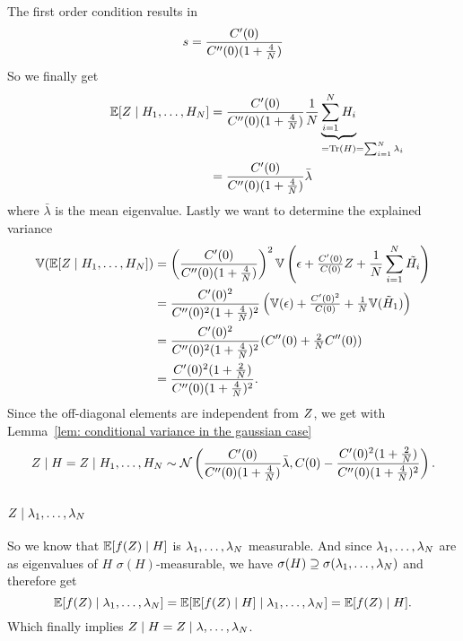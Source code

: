 The first order condition results in
\[
	s = \frac{C'(0)}{C''(0)(1+\tfrac4{N})}
\]
So we finally get
\begin{align*}
	\E[\rf\mid H_1,\dots,H_\dimension]
	&= \frac{\sqC'(0)}{\sqC''(0)(1+\tfrac4{\dimension})}
	\frac1\dimension\underbrace{\sum_{i=1}^\dimension H_i}_{
		=\trace(H) \mathrlap{=\sum_{i=1}^\dimension\lambda_i}
	}\\
	&= \frac{\sqC'(0)}{\sqC''(0)(1+\tfrac4{\dimension})}
	\bar{\lambda}
\end{align*}
where \(\bar{\lambda}\) is the mean eigenvalue. Lastly we want to determine
the explained variance
\begin{align*}
	\mathbb{V}(\mathbb{E}[Z\mid H_1,\dots,H_N])
	&= \left(\frac{C'(0)}{C''(0)(1+\tfrac4{N})}\right)^2
	\mathbb{V}\left(
		\epsilon + \tfrac{C'(0)}{C(0)}Z + \frac{1}{N}\sum_{i=1}^N \tilde{H_i}
	\right)\\
	&= \frac{C'(0)^2}{C''(0)^2(1+\tfrac4{N})^2}
	\left(
		\mathbb{V}(\epsilon) + \tfrac{C'(0)^2}{C(0)} + \tfrac1{N}\mathbb{V}(\tilde{H}_1)
	\right)\\
	&= \frac{C'(0)^2}{C''(0)^2(1+\tfrac4{N})^2}
	(C''(0) + \tfrac2{N}C''(0))\\
	&= \frac{C'(0)^2(1+\tfrac2{N})}{C''(0)(1+\tfrac4{N})^2}.
\end{align*}
Since the off-diagonal elements are independent from \(Z\), we get with
Lemma~\ref{lem: conditional variance in the gaussian case}
\[
	Z\mid H = Z \mid H_1,\dots, H_N \sim \mathcal{N}\left(
		\frac{C'(0)}{C''(0)(1+\tfrac4{N})}\bar{\lambda},
		C(0)-\frac{C'(0)^2(1+\tfrac2{N})}{C''(0)(1+\tfrac4{N})^2}
	\right).
\]

\subsection{\texorpdfstring{\(Z\mid \lambda_1,\dots,\lambda_N\)}{Z|λ1,...,λN}}

So we know that \(\mathbb{E}[f(Z)\mid H]\) is \(\lambda_1,\dots,\lambda_N\)
measurable. And since \(\lambda_1,\dots,\lambda_N\) are as eigenvalues
of \(H\) \(\sigma(H)\)-measurable, we have \(\sigma(H)\supseteq \sigma(\lambda_1,\dots,\lambda_N)\)
and therefore get
\[
	\mathbb{E}[f(Z)\mid \lambda_1,\dots,\lambda_N]
	= \mathbb{E}[\mathbb{E}[f(Z)\mid H] \mid \lambda_1,\dots,\lambda_N]
	= \mathbb{E}[f(Z)\mid H].
\]
Which finally implies \(Z\mid H = Z\mid \lambda,\dots,\lambda_N\).